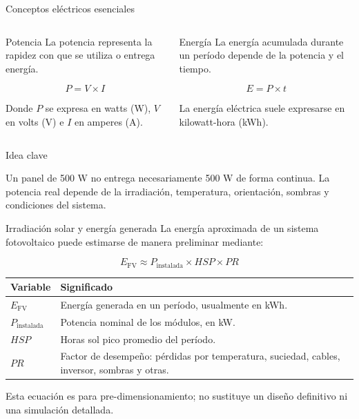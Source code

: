 \documentclass[aspectratio=169,10pt]{beamer}
\newcommand{\idea}[1]{
\begin{block}{Idea clave}
#1
\end{block}
}
\begin{document}
\begin{frame}{Conceptos eléctricos esenciales}
\begin{columns}
\begin{block}{Potencia}
La potencia representa la rapidez con que se utiliza o entrega energía.

\[
P = V \times I
\]

Donde \(P\) se expresa en watts (W), \(V\) en volts (V) e \(I\) en amperes (A).
\end{block}

\begin{block}{Energía}
La energía acumulada durante un período depende de la potencia y el tiempo.

\[
E = P \times t
\]

La energía eléctrica suele expresarse en kilowatt-hora (kWh).
\end{block}
\end{columns}

\vspace{0.35cm}

\idea{
Un panel de 500 W no entrega necesariamente 500 W de forma continua. La potencia real depende de la irradiación, temperatura, orientación, sombras y condiciones del sistema.
}
\end{frame}

\begin{frame}{Irradiación solar y energía generada}
La energía aproximada de un sistema fotovoltaico puede estimarse de manera preliminar mediante:

\[
E_{\text{FV}} \approx P_{\text{instalada}} \times HSP \times PR
\]

\begin{table}
\centering
\small
\begin{tabular}{ll}
\toprule
\textbf{Variable} & \textbf{Significado} \\
\midrule
\(E_{\text{FV}}\) & Energía generada en un período, usualmente en kWh. \\
\(P_{\text{instalada}}\) & Potencia nominal de los módulos, en kW. \\
\(HSP\) & Horas sol pico promedio del período. \\
\(PR\) & Factor de desempeño: pérdidas por temperatura, suciedad, cables, inversor, sombras y otras. \\
\bottomrule
\end{tabular}
\end{table}

\alert{Esta ecuación es para pre-dimensionamiento; no sustituye un diseño definitivo ni una simulación detallada.}
\end{frame}
\end{document}
